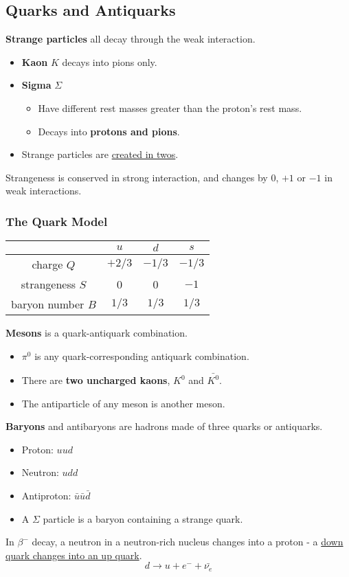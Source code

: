 \subsection{Quarks and Antiquarks}

\textbf{Strange particles} all decay through the weak interaction.
\begin{itemize}
    \item \textbf{Kaon} $K$ decays into pions only.
    \item \textbf{Sigma} $\Sigma$
        \begin{itemize}
            \item Have different rest masses greater than the proton's rest mass.
            \item Decays into \textbf{protons and pions}.
        \end{itemize}
    \item Strange particles are \underline{created in twos}.
\end{itemize}

Strangeness is conserved in strong interaction, and changes by $0$, $+1$ or $-1$ in weak interactions.

\subsubsection*{The Quark Model}

\begin{center}
    \begin{tabular}{|c|c|c|c|}
        \hline
        & $u$ & $d$ & $s$\\
        \hline
        charge $Q$ & $+2/3$ & $-1/3$ & $-1/3$\\
        strangeness $S$ & 0 & 0 & $-1$\\
        baryon number $B$ & $1/3$ & $1/3$ & $1/3$\\
        \hline
    \end{tabular}
\end{center}

\textbf{Mesons} is a quark-antiquark combination.
\begin{itemize}
    \item $\pi^0$ is any quark-corresponding antiquark combination.
    \item There are \textbf{two uncharged kaons}, $K^0$ and $\bar{K^0}$.
    \item The antiparticle of any meson is another meson.
\end{itemize}

\textbf{Baryons} and antibaryons are hadrons made of three quarks or antiquarks.
\begin{itemize}
    \item Proton: $uud$
    \item Neutron: $udd$
    \item Antiproton: $\bar u\bar u\bar d$
    \item A $\Sigma$ particle is a baryon containing a strange quark.
\end{itemize}

In $\beta^-$ decay, a neutron in a neutron-rich nucleus changes into a proton - a \underline{down quark changes into an up quark}.
$$d\to u+e^-+\bar{\nu_e}$$
